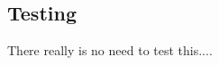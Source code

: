 \documentclass{beamer}
\begin{document}
\subsection{Testing}
\begin{frame}
    There really is no need to test this....
\end{frame}

\AtBeginSection{}
\section*{}

%  
%  
\end{document}
